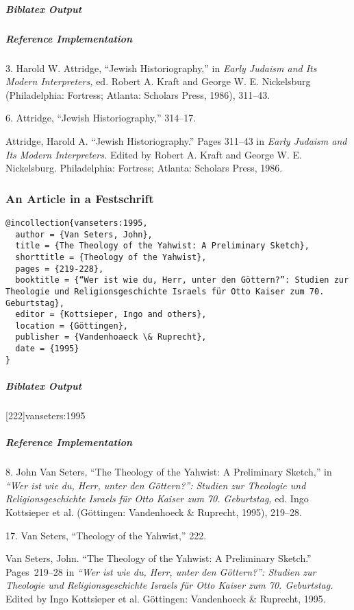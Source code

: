 \documentclass[a4paper]{article}
\newenvironment{biboutput}{%
  \subparagraph{Biblatex Output}
}{\color{black}}
\newenvironment{refimp}{%
  \subparagraph{Reference Implementation}
  \color{reference-colour}
  \rm
}{\par\color{black}}
\begin{document}
\begin{biboutput}
\end{biboutput}

\begin{refimp}
  3. Harold W. Attridge, “Jewish Historiography,” in \emph{Early Judaism and
  Its Modern Interpreters,} ed. Robert A. Kraft and George W. E. Nickelsburg
  (Philadelphia: Fortress; Atlanta: Scholars Press, 1986), 311–43.
  
  6. Attridge, “Jewish Historiography,” 314–17.

  Attridge, Harold A. “Jewish Historiography.” Pages 311–43 in \emph{Early
  Judaism and Its Modern Interpreters.} Edited by Robert A. Kraft and George
  W. E. Nickelsburg. Philadelphia: Fortress; Atlanta: Scholars Press, 1986.
\end{refimp}

\subsubsection{An Article in a Festschrift}

\begin{lstlisting}
@incollection{vanseters:1995,
  author = {Van Seters, John},
  title = {The Theology of the Yahwist: A Preliminary Sketch},
  shorttitle = {Theology of the Yahwist},
  pages = {219-228},
  booktitle = {“Wer ist wie du, Herr, unter den Göttern?”: Studien zur Theologie und Religionsgeschichte Israels für Otto Kaiser zum 70. Geburtstag},
  editor = {Kottsieper, Ingo and others},
  location = {Göttingen},
  publisher = {Vandenhoaeck \& Ruprecht},
  date = {1995}
}
\end{lstlisting}  

\begin{biboutput}
  [222]{vanseters:1995}
\end{biboutput}

\begin{refimp}
  8. John Van Seters, “The Theology of the Yahwist: A Preliminary Sketch,” in
  \emph{“Wer ist wie du, Herr, unter den Göttern?”: Studien zur Theologie und
  Religionsgeschichte Israels für Otto Kaiser zum 70. Geburtstag,} ed. Ingo
  Kottsieper et al. (Göttingen: Vandenhoeck \& Ruprecht, 1995), 219–28.

  17. Van Seters, “Theology of the Yahwist,” 222.

  \hangindent\bibindent Van Seters, John. “The Theology of the Yahwist: A
  Preliminary Sketch.” Pages~219–28 in \emph{“Wer ist wie du, Herr, unter den
  Göttern?”: Studien zur Theologie und Religionsgeschichte Israels für Otto
  Kaiser zum 70. Geburtstag.} Edited by Ingo Kottsieper et al. Göttingen:
  Vandenhoeck \& Ruprecht, 1995.
\end{refimp}
\end{document}
